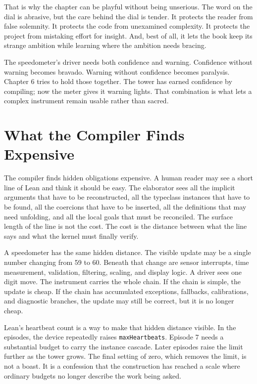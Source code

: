 That is why the chapter can be playful without being unserious. The word on
the dial is abrasive, but the care behind the dial is tender. It protects the
reader from false solemnity. It protects the code from unexamined complexity.
It protects the project from mistaking effort for insight. And, best of all, it
lets the book keep its strange ambition while learning where the ambition needs
bracing.

The speedometer's driver needs both confidence and warning. Confidence without
warning becomes bravado. Warning without confidence becomes paralysis. Chapter
6 tries to hold those together. The tower has earned confidence by compiling;
now the meter gives it warning lights. That combination is what lets a complex
instrument remain usable rather than sacred.

\section{What the Compiler Finds Expensive}
\label{se:what-compiler-finds-expensive}

The compiler finds hidden obligations expensive. A human reader may see a short
line of Lean and think it should be easy. The elaborator sees all the implicit
arguments that have to be reconstructed, all the typeclass instances that have
to be found, all the coercions that have to be inserted, all the definitions
that may need unfolding, and all the local goals that must be reconciled. The
surface length of the line is not the cost. The cost is the distance between
what the line says and what the kernel must finally verify.

A speedometer has the same hidden distance. The visible update may be a single
number changing from 59 to 60. Beneath that change are sensor interrupts, time
measurement, validation, filtering, scaling, and display logic. A driver sees
one digit move. The instrument carries the whole chain. If the chain is simple,
the update is cheap. If the chain has accumulated exceptions, fallbacks,
calibrations, and diagnostic branches, the update may still be correct, but it
is no longer cheap.

Lean's heartbeat count is a way to make that hidden distance visible. In the
episodes, the device repeatedly raises \texttt{maxHeartbeats}. Episode 7 needs
a substantial budget to carry the instance cascade. Later episodes raise the
limit further as the tower grows. The final setting of zero, which removes the
limit, is not a boast. It is a confession that the construction has reached a
scale where ordinary budgets no longer describe the work being asked.

